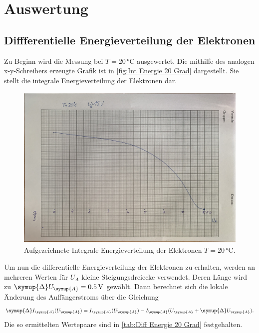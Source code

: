 \section{Auswertung}
\label{sec:Auswertung}

\subsection{Diffferentielle Energieverteilung der Elektronen}

Zu Beginn wird die Messung bei $T=20\,\unit{\celsius}$ ausgewertet.
Die mithilfe des analogen x-y-Schreibers erzeugte Grafik ist in \autoref{fig:Int Energie 20 Grad} dargestellt.
Sie stellt die integrale Energieverteilung der Elektronen dar.

\begin{figure}[H]
  \centering
  \includegraphics[height=8cm]{content/pics/originaldaten/1.pdf}
  \caption{Aufgezeichnete Integrale Energieverteilung der Elektronen $T=20\,\unit{\celsius}$.}
  \label{fig:Int Energie 20 Grad}
\end{figure}

Um nun die differentielle Energieverteilung der Elektronen zu erhalten, werden an mehreren Werten
für $U_A$ kleine Steigungsdreiecke verwendet.
Deren Länge wird zu $\symup{\Delta}U_{\symup{A}}=0.5\,\unit{\volt}$ gewählt. Dann berechnet sich die lokale
Änderung des Auffängerstroms über die Gleichung
\begin{equation*}
\symup{\Delta}I_{\symup{A}}(U_{\symup{A}})=I_{\symup{A}}(U_{\symup{A}})-I_{\symup{A}}(U_{\symup{A}}+\symup{\Delta}U_{\symup{A}}).
\end{equation*}
Die so ermittelten Wertepaare sind in \autoref{tab:Diff Energie 20 Grad} festgehalten.

